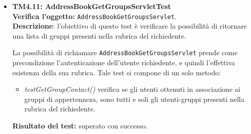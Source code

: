 \begin{itemize}
\item \textbf{TM4.11: AddressBookGetGroupsServletTest}\\
\textbf{Verifica l'oggetto:} \texttt{AddressBookGetGroupsServlet}.\\
\textbf{Descrizione}: l'obiettivo di questo test è verificare la possibilità di ritornare una lista di gruppi presenti nella rubrica del richiedente.

La possibilità di richiamare \texttt{AddressBookGetGroupsServlet} prende come precondizione l'autenticazione dell'utente richiedente, e quindi l'effettiva esistenza della sua rubrica.
Tale test si compone di un solo metodo:
\begin{itemize}
\item \textit{testGetGroupContact()} verifica se gli utenti ottenuti in associazione ai gruppi di appertenneza, sono tutti e soli gli utenti-gruppi presenti nella rubrica del richiedente.
\end{itemize}
\textbf{Risultato del test:} superato con successo.
\end{itemize}

